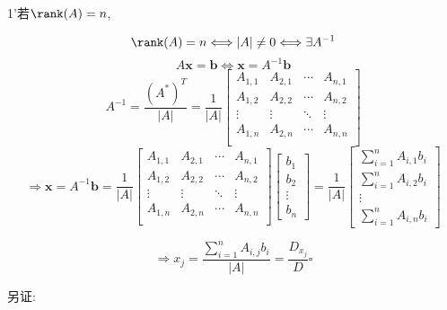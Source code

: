 \documentclass[UTF8]{ctexart}
\begin{document}
        \begin{prf}
			1'若$\rank(A)=n$, 
			
			\[\rank(A)=n\Longleftrightarrow |A|\neq 0\Longleftrightarrow\exists A^{-1}\]
			\[A\mathbf{x}=\mathbf{b}\Longleftrightarrow \mathbf{x}=A^{-1}\mathbf{b}\]
			\[A^{-1}=\frac{(A^*)^T}{|A|}=\frac{1}{|A|}
			\begin{bmatrix}
				A_{1,1} & A_{2,1} & \cdots & A_{n,1}\\
				A_{1,2} & A_{2,2} & \cdots & A_{n,2}\\
				\vdots & \vdots & \ddots & \vdots\\
				A_{1,n} & A_{2,n} & \cdots & A_{n,n}\\
			\end{bmatrix}\]
			\[\Longrightarrow \mathbf{x}=A^{-1}\mathbf{b}=\frac{1}{|A|}
			\begin{bmatrix}
				A_{1,1} & A_{2,1} & \cdots & A_{n,1}\\
				A_{1,2} & A_{2,2} & \cdots & A_{n,2}\\
				\vdots & \vdots & \ddots & \vdots\\
				A_{1,n} & A_{2,n} & \cdots & A_{n,n}\\
			\end{bmatrix}
			\begin{bmatrix}
				b_1\\
				b_2\\
				\vdots\\
				b_n
			\end{bmatrix}
			=\frac{1}{|A|}\begin{bmatrix}
				\sum\limits_{i=1}^nA_{i,1}b_i\\
				\sum\limits_{i=1}^nA_{i,2}b_i\\
				\vdots\\
				\sum\limits_{i=1}^nA_{i,n}b_i
			\end{bmatrix}\]
			
			\[\Longrightarrow x_j=\frac{\sum\limits_{i=1}^nA_{i,j}b_i}{|A|}=\frac{D_{x_j}}{D}\square\]

		另证: 
			

\end{prf}
\end{document}
